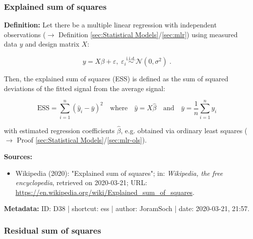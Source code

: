 \documentclass[a4paper,12pt,twoside]{book}
\begin{document}
\subsubsection[\textit{Explained sum of squares}]{Explained sum of squares} \label{sec:ess}
\setcounter{equation}{0}

\textbf{Definition:} Let there be a multiple linear regression with independent observations ($\rightarrow$ Definition \ref{sec:Statistical Models}/\ref{sec:mlr}) using measured data $y$ and design matrix $X$:

\begin{equation} \label{eq:ess-mlr}
y = X\beta + \varepsilon, \; \varepsilon_i \overset{\mathrm{i.i.d.}}{\sim} \mathcal{N}(0, \sigma^2) \; .
\end{equation}

Then, the explained sum of squares (ESS) is defined as the sum of squared deviations of the fitted signal from the average signal:

\begin{equation} \label{eq:ess-ess}
\mathrm{ESS} = \sum_{i=1}^n (\hat{y}_i - \bar{y})^2 \quad \text{where} \quad \hat{y} = X \hat{\beta} \quad \text{and} \quad \bar{y} = \frac{1}{n} \sum_{i=1}^n y_i
\end{equation}

with estimated regression coefficients $\hat{\beta}$, e.g. obtained via ordinary least squares ($\rightarrow$ Proof \ref{sec:Statistical Models}/\ref{sec:mlr-ols}).


\vspace{1em}
\textbf{Sources:}
\begin{itemize}
\item Wikipedia (2020): "Explained sum of squares"; in: \textit{Wikipedia, the free encyclopedia}, retrieved on 2020-03-21; URL: \url{https://en.wikipedia.org/wiki/Explained_sum_of_squares}.
\end{itemize}


\vspace{1em}
\textbf{Metadata:} ID: D38 | shortcut: ess | author: JoramSoch | date: 2020-03-21, 21:57.
\vspace{1em}



\subsubsection[\textit{Residual sum of squares}]{Residual sum of squares} \label{sec:rss}
\setcounter{equation}{0}
\end{document}
